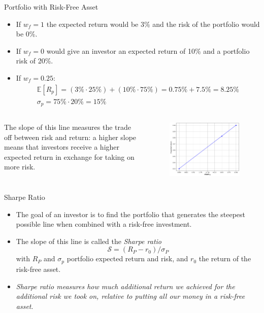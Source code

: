 \documentclass{beamer}
\begin{document}
\begin{frame}{Portfolio with Risk-Free Asset}
  \begin{itemize}
  \item If $w_f = 1$ the expected return would be 3\% and the risk of the portfolio would be 0\%. 
  \item If $w_f = 0$ would give an investor an expected return of 10\% and a portfolio risk of 20\%. 
  \item If $w_f=0.25$:
    \begin{equation*}
      \begin{gathered}
      \mathbb{E}[R_p] = ( 3\% \cdot 25\% ) + ( 10\% \cdot 75\% ) = 0.75\% + 7.5\% = 8.25\%\\
      \sigma_p = 75\%\cdot 20\% = 15\%
      \end{gathered}
    \end{equation*}
  \end{itemize}
  \begin{columns}
    The slope of this line measures the trade off between risk and return: a higher slope means that investors receive a higher expected return in exchange for taking on more risk. 
  \begin{figure}[h]
    \begin{center}
      \includegraphics[width=0.6\linewidth]{cal}
    \end{center}
  \end{figure}
  \end{columns}
\end{frame}

\begin{frame}{Sharpe Ratio}
  \begin{itemize}
    \item The goal of an investor is to find the portfolio that generates the steepest possible line when combined with a risk-free investment. 
    \item  The slope of this line is called the \emph{Sharpe ratio}
      \begin{equation*}
        \mathcal{S} = (R_P - r_0) / \sigma_P
      \end{equation*}
      with $R_P$ and $\sigma_p$ portfolio expected return and risk, and $r_0$ the return of the risk-free asset.
    \item \emph{Sharpe ratio measures how much additional return we achieved for the additional risk we took on, relative to putting all our money in a risk-free asset}.
  \end{itemize}
\end{frame}
\end{document}

